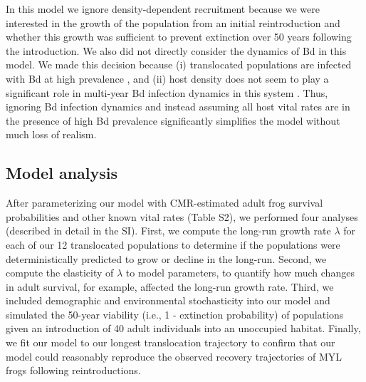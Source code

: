 \documentclass[9pt,twocolumn,twoside,lineno]{pnas-new}
\begin{document}
{In this model we ignore density-dependent recruitment because we were
interested in the growth of the population from an initial
reintroduction and whether this growth was sufficient to prevent
extinction over 50 years following the introduction. We also did not
directly consider the dynamics of Bd in this model. We made this
decision because (i) translocated populations are infected with Bd at
high prevalence \citep{joseph2018}, and (ii) host density does not seem
to play a significant role in multi-year Bd infection dynamics in this
system \citep{wilber2022}. Thus, ignoring Bd infection dynamics and
instead assuming all host vital rates are in the presence of high Bd
prevalence significantly simplifies the model without much loss of
realism.

\hypertarget{model-analysis}{%
\subsection*{Model analysis}\label{model-analysis}}

After parameterizing our model with CMR-estimated adult frog survival
probabilities and other known vital rates (Table S2), we performed four analyses (described in detail in the SI).
First, we compute the long-run growth rate \(\lambda\) for each of our
12 translocated populations to determine if the populations were
deterministically predicted to grow or decline in the long-run. Second,
we compute the elasticity of \(\lambda\) to model parameters, to
quantify how much changes in adult survival, for example, affected the
long-run growth rate. Third, we included demographic and environmental
stochasticity into our model and simulated the 50-year viability (i.e.,
1 - extinction probability) of populations given an introduction of 40
adult individuals into an unoccupied habitat. Finally, we fit our model
to our longest translocation trajectory to confirm that our model could
reasonably reproduce the observed recovery trajectories of MYL frogs
following reintroductions.}


\showmatmethods{} %

\end{document}
